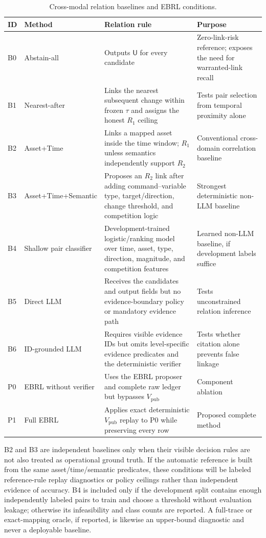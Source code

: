 \documentclass[conference]{IEEEtran}
\begin{document}
\begin{table}[t]
\caption{Cross-modal relation baselines and EBRL conditions.}
\label{tab:baselines}
\centering\footnotesize
\begin{tabularx}{\textwidth}{@{}l l X X@{}}
\toprule
ID & Method & Relation rule & Purpose\\
\midrule
B0 & Abstain-all & Outputs $\mathsf{U}$ for every candidate & Zero-link-risk reference; exposes the need for warranted-link recall\\
B1 & Nearest-after & Links the nearest subsequent change within frozen $\tau$ and assigns the honest $R_1$ ceiling & Tests pair selection from temporal proximity alone\\
B2 & Asset+Time & Links a mapped asset inside the time window; $R_1$ unless semantics independently support $R_2$ & Conventional cross-domain correlation baseline\\
B3 & Asset+Time+Semantic & Proposes an $R_2$ link after adding command--variable type, target/direction, change threshold, and competition logic & Strongest deterministic non-LLM baseline\\
B4 & Shallow pair classifier & Development-trained logistic/ranking model over time, asset, type, direction, magnitude, and competition features & Learned non-LLM baseline, if development labels suffice\\
B5 & Direct LLM & Receives the candidates and output fields but no evidence-boundary policy or mandatory evidence path & Tests unconstrained relation inference\\
B6 & ID-grounded LLM & Requires visible evidence IDs but omits level-specific evidence predicates and the deterministic verifier & Tests whether citation alone prevents false linkage\\
P0 & EBRL without verifier & Uses the EBRL proposer and complete raw ledger but bypasses $V_{\mathrm{pub}}$ & Component ablation\\
P1 & Full EBRL & Applies exact deterministic $V_{\mathrm{pub}}$ replay to P0 while preserving every row & Proposed complete method\\
\bottomrule
\end{tabularx}
\end{table}

B2 and B3 are independent baselines only when their visible decision rules are not also treated as operational ground truth. If the automatic reference is built from the same asset/time/semantic predicates, these conditions will be labeled reference-rule replay diagnostics or policy ceilings rather than independent evidence of accuracy. B4 is included only if the development split contains enough independently labeled pairs to train and choose a threshold without evaluation leakage; otherwise its infeasibility and class counts are reported. A full-trace or exact-mapping oracle, if reported, is likewise an upper-bound diagnostic and never a deployable baseline.
\end{document}
